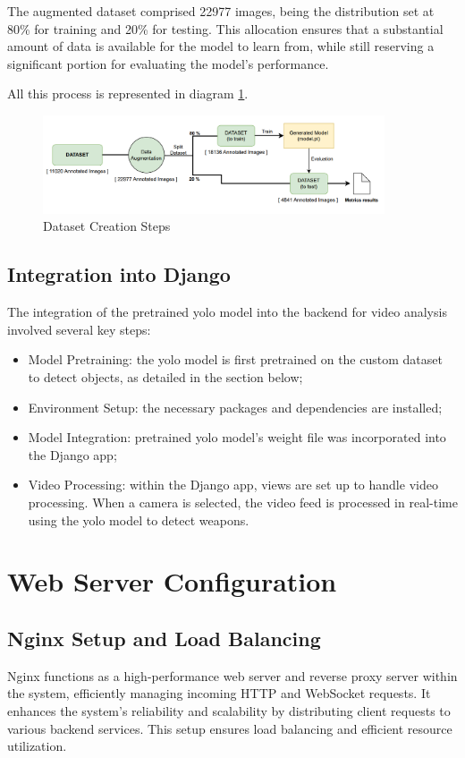 The augmented dataset comprised 22977 images, being the distribution set at 80\% for training and 20\% for testing. 
This allocation ensures that a substantial amount of data is available for the model to learn from, while 
still reserving a significant portion for evaluating the model's performance.

All this process is represented in diagram \ref{fig:dataset-mq}.

\begin{figure}[h]
    \centering 
    \includegraphics[width=0.9\textwidth]{figs/dataset-creation2.png} 
    \caption{Dataset Creation Steps}
    \label{fig:dataset-mq}
\end{figure}

\subsection{Integration into Django}
The integration of the pretrained \ac{yolo} model into the backend for video analysis involved several key steps:

\begin{itemize}
    \item Model Pretraining: the \ac{yolo} model is first pretrained on the custom dataset to detect objects, 
    as detailed in the section below;
    \item Environment Setup: the necessary packages and dependencies are installed;
    \item Model Integration: pretrained \ac{yolo} model's weight file was incorporated into the Django app;
    \item Video Processing: within the Django app, views are set up to handle video processing. When a camera is 
    selected, the video feed is processed in real-time using the \ac{yolo} model to detect weapons.
\end{itemize}

\section{Web Server Configuration}
\subsection{Nginx Setup and Load Balancing}
Nginx functions as a high-performance web server and reverse proxy server within the system, efficiently managing 
incoming HTTP and WebSocket requests. It enhances the system's reliability and scalability by distributing client 
requests to various backend services. This setup ensures load balancing and efficient resource utilization.

